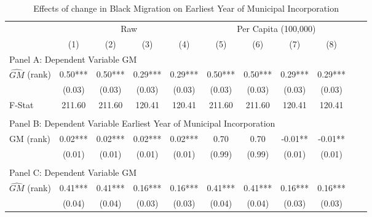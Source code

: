  \begin{table}[htbp]\centering {} \begin{threeparttable} \caption{Effects of change in Black Migration on Earliest Year of Municipal Incorporation} \begin{tabular}{l*{10}{c}} \toprule
                &\multicolumn{4}{c}{Raw}                                    &\multicolumn{4}{c}{Per Capita (100,000)}                   \\\cmidrule(lr){2-5}\cmidrule(lr){6-9}
                &\multicolumn{1}{c}{(1)}   &\multicolumn{1}{c}{(2)}   &\multicolumn{1}{c}{(3)}   &\multicolumn{1}{c}{(4)}   &\multicolumn{1}{c}{(5)}   &\multicolumn{1}{c}{(6)}   &\multicolumn{1}{c}{(7)}   &\multicolumn{1}{c}{(8)}   \\
\cmidrule(lr){1-9}
\multicolumn{8}{l}{Panel A: Dependent Variable GM}\\
\cmidrule(lr){1-9}
$\hat{GM}$ (rank)&       0.50***&       0.50***&       0.29***&       0.29***&       0.50***&       0.50***&       0.29***&       0.29***\\
                &     (0.03)   &     (0.03)   &     (0.03)   &     (0.03)   &     (0.03)   &     (0.03)   &     (0.03)   &     (0.03)   \\
\midrule
F-Stat          &     211.60   &     211.60   &     120.41   &     120.41   &     211.60   &     211.60   &     120.41   &     120.41   \\
\cmidrule[\heavyrulewidth](lr){1-9} \\ \cmidrule[\heavyrulewidth](lr){1-9}
\multicolumn{8}{l}{Panel B: Dependent Variable Earliest Year of Municipal Incorporation}\\
\cmidrule(lr){1-9}
GM  (rank)      &       0.02***&       0.02***&       0.02***&       0.02***&       0.70   &       0.70   &      -0.01** &      -0.01** \\
                &     (0.01)   &     (0.01)   &     (0.01)   &     (0.01)   &     (0.99)   &     (0.99)   &     (0.01)   &     (0.01)   \\
\cmidrule[\heavyrulewidth](lr){1-9} \\ \cmidrule[\heavyrulewidth](lr){1-9}
\multicolumn{8}{l}{Panel C: Dependent Variable GM}\\
\cmidrule(lr){1-9}
$\hat{GM}$ (rank)&       0.41***&       0.41***&       0.16***&       0.16***&       0.41***&       0.41***&       0.16***&       0.16***\\
                &     (0.04)   &     (0.04)   &     (0.03)   &     (0.03)   &     (0.04)   &     (0.04)   &     (0.03)   &     (0.03)   \\

\end{tabular}
\end{threeparttable}
\end{table}
